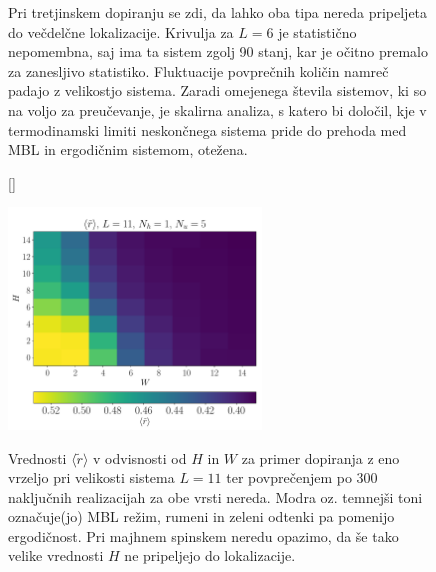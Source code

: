 \documentclass[10pt,a4paper]{article}
\begin{document}
\begin{figure}[H]
\caption{Pri tretjinskem dopiranju se zdi, da lahko oba tipa nereda pripeljeta do večdelčne lokalizacije. Krivulja za $L=6$ je statistično nepomembna, saj ima ta sistem zgolj 90 stanj, kar je očitno premalo za zanesljivo statistiko. Fluktuacije povprečnih količin namreč padajo z velikostjo sistema. Zaradi omejenega števila sistemov, ki so na voljo za preučevanje, je skalirna analiza, s katero bi določil, kje v termodinamski limiti neskončnega sistema pride do prehoda med MBL in ergodičnim sistemom, otežena.  }
\label{fig:double_plot_disorder_sym_break_12_4_4_slo}
\end{figure}
\begin{figure}[H]
[\FBwidth]
{\caption{Vrednosti $\langle \tilde{r}\rangle$ v odvisnosti od $H$ in $W$ za primer dopiranja z eno vrzeljo pri velikosti sistema $L=11$ ter povprečenjem po 300 naključnih realizacijah za obe vrsti nereda. Modra oz. temnejši toni označuje(jo) MBL režim, rumeni in zeleni odtenki pa pomenijo ergodičnost. Pri majhnem spinskem neredu opazimo, da še tako velike vrednosti $H$ ne pripeljejo do lokalizacije. }\label{fig:r_density_11_1_5}}
{\includegraphics[width=0.6\textwidth]{r_density_11_1_5.pdf}}
\end{figure}
\end{document}
